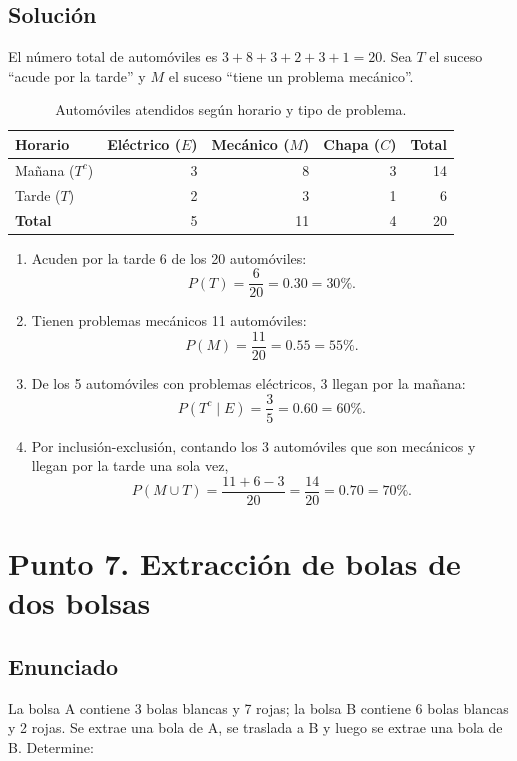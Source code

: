 \documentclass[12pt]{article}
\begin{document}
\subsection*{Solución}

El número total de automóviles es $3+8+3+2+3+1=20$. Sea $T$ el suceso ``acude por la tarde'' y $M$ el suceso ``tiene un problema mecánico''.

\begin{table}[H]
\centering
\small
\renewcommand{\arraystretch}{1.15}
\begin{tabular}{|l|r|r|r|r|}
\hline
\textbf{Horario} & \textbf{Eléctrico ($E$)} & \textbf{Mecánico ($M$)} & \textbf{Chapa ($C$)} & \textbf{Total} \\ \hline
Mañana ($T^c$) & 3 & 8 & 3 & 14 \\ \hline
Tarde ($T$) & 2 & 3 & 1 & 6 \\ \hline
\textbf{Total} & 5 & 11 & 4 & 20 \\ \hline
\end{tabular}
\caption{Automóviles atendidos según horario y tipo de problema.}
\label{tab:taller-horario-problema}
\end{table}

\begin{enumerate}
    \item Acuden por la tarde 6 de los 20 automóviles:
    \[
    P(T)=\frac{6}{20}=0.30=30\%.
    \]
    \item Tienen problemas mecánicos 11 automóviles:
    \[
    P(M)=\frac{11}{20}=0.55=55\%.
    \]
    \item De los 5 automóviles con problemas eléctricos, 3 llegan por la mañana:
    \[
    P(T^c\mid E)=\frac{3}{5}=0.60=60\%.
    \]
    \item Por inclusión-exclusión, contando los 3 automóviles que son mecánicos y llegan por la tarde una sola vez,
    \[
    P(M\cup T)=\frac{11+6-3}{20}=\frac{14}{20}=0.70=70\%.
    \]
\end{enumerate}

\section*{Punto 7. Extracción de bolas de dos bolsas}

\subsection*{Enunciado}

La bolsa A contiene 3 bolas blancas y 7 rojas; la bolsa B contiene 6 bolas blancas y 2 rojas. Se extrae una bola de A, se traslada a B y luego se extrae una bola de B. Determine:
\end{document}
